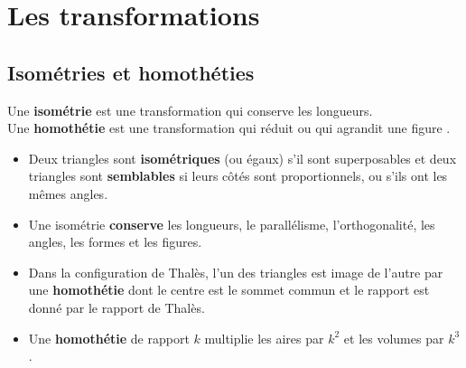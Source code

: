 \section{Les transformations}

\subsection{Isométries et homothéties}

\begin{definition}
   Une \textbf{isométrie} est une transformation qui conserve les longueurs. \\
   Une \textbf{homothétie} est une transformation qui réduit ou qui agrandit une figure .
\end{definition}

\begin{propriete}
   \begin{itemize}
      \item Deux triangles sont {\bf isométriques} (ou égaux) s'il sont superposables et deux triangles sont {\bf semblables} si leurs côtés sont proportionnels, ou s'ils ont les mêmes angles.
      \item Une isométrie {\bf conserve} les longueurs, le parallélisme, l'orthogonalité, les angles, les formes et les figures.
      \item Dans la configuration de Thalès, l'un des triangles est image de l'autre par une {\bf homothétie} dont le centre est le sommet commun et le rapport est donné par le rapport de Thalès.
      \item Une {\bf homothétie} de rapport $k$ multiplie les aires par $k^2$ et les volumes par $k^3$. \\ [-8mm]
   \end{itemize}
 \end{propriete}
 
